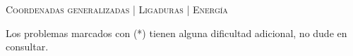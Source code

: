 \documentclass[11pt, spanish, a4paper, twoside]{article}
\begin{document}
\begin{center}
  \textsc{\large Coordenadas generalizadas | Ligaduras | Energía}
\end{center}
\noindent
Los problemas marcados con (*) tienen alguna dificultad adicional, no dude en consultar.

\begin{enumerate}

%


\end{enumerate}
\end{document}

